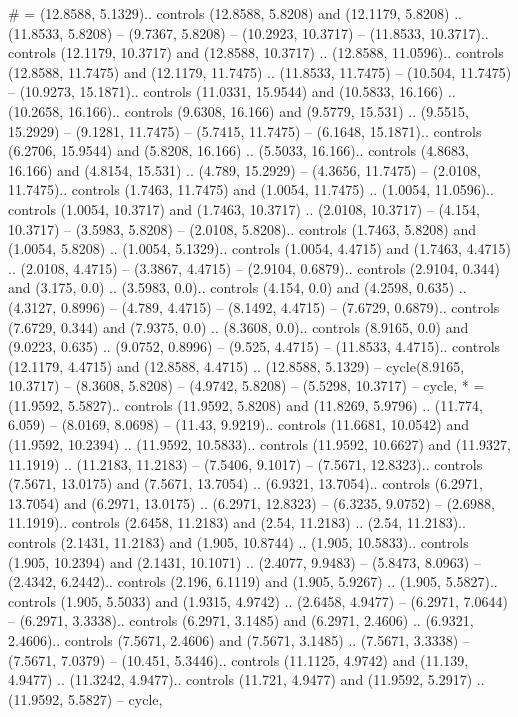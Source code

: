 {\#} = {(12.8588, 5.1329).. controls (12.8588, 5.8208) and (12.1179, 5.8208) .. (11.8533, 5.8208) -- (9.7367, 5.8208) -- (10.2923, 10.3717) -- (11.8533, 10.3717).. controls (12.1179, 10.3717) and (12.8588, 10.3717) .. (12.8588, 11.0596).. controls (12.8588, 11.7475) and (12.1179, 11.7475) .. (11.8533, 11.7475) -- (10.504, 11.7475) -- (10.9273, 15.1871).. controls (11.0331, 15.9544) and (10.5833, 16.166) .. (10.2658, 16.166).. controls (9.6308, 16.166) and (9.5779, 15.531) .. (9.5515, 15.2929) -- (9.1281, 11.7475) -- (5.7415, 11.7475) -- (6.1648, 15.1871).. controls (6.2706, 15.9544) and (5.8208, 16.166) .. (5.5033, 16.166).. controls (4.8683, 16.166) and (4.8154, 15.531) .. (4.789, 15.2929) -- (4.3656, 11.7475) -- (2.0108, 11.7475).. controls (1.7463, 11.7475) and (1.0054, 11.7475) .. (1.0054, 11.0596).. controls (1.0054, 10.3717) and (1.7463, 10.3717) .. (2.0108, 10.3717) -- (4.154, 10.3717) -- (3.5983, 5.8208) -- (2.0108, 5.8208).. controls (1.7463, 5.8208) and (1.0054, 5.8208) .. (1.0054, 5.1329).. controls (1.0054, 4.4715) and (1.7463, 4.4715) .. (2.0108, 4.4715) -- (3.3867, 4.4715) -- (2.9104, 0.6879).. controls (2.9104, 0.344) and (3.175, 0.0) .. (3.5983, 0.0).. controls (4.154, 0.0) and (4.2598, 0.635) .. (4.3127, 0.8996) -- (4.789, 4.4715) -- (8.1492, 4.4715) -- (7.6729, 0.6879).. controls (7.6729, 0.344) and (7.9375, 0.0) .. (8.3608, 0.0).. controls (8.9165, 0.0) and (9.0223, 0.635) .. (9.0752, 0.8996) -- (9.525, 4.4715) -- (11.8533, 4.4715).. controls (12.1179, 4.4715) and (12.8588, 4.4715) .. (12.8588, 5.1329) -- cycle(8.9165, 10.3717) -- (8.3608, 5.8208) -- (4.9742, 5.8208) -- (5.5298, 10.3717) -- cycle},
{*} = {(11.9592, 5.5827).. controls (11.9592, 5.8208) and (11.8269, 5.9796) .. (11.774, 6.059) -- (8.0169, 8.0698) -- (11.43, 9.9219).. controls (11.6681, 10.0542) and (11.9592, 10.2394) .. (11.9592, 10.5833).. controls (11.9592, 10.6627) and (11.9327, 11.1919) .. (11.2183, 11.2183) -- (7.5406, 9.1017) -- (7.5671, 12.8323).. controls (7.5671, 13.0175) and (7.5671, 13.7054) .. (6.9321, 13.7054).. controls (6.2971, 13.7054) and (6.2971, 13.0175) .. (6.2971, 12.8323) -- (6.3235, 9.0752) -- (2.6988, 11.1919).. controls (2.6458, 11.2183) and (2.54, 11.2183) .. (2.54, 11.2183).. controls (2.1431, 11.2183) and (1.905, 10.8744) .. (1.905, 10.5833).. controls (1.905, 10.2394) and (2.1431, 10.1071) .. (2.4077, 9.9483) -- (5.8473, 8.0963) -- (2.4342, 6.2442).. controls (2.196, 6.1119) and (1.905, 5.9267) .. (1.905, 5.5827).. controls (1.905, 5.5033) and (1.9315, 4.9742) .. (2.6458, 4.9477) -- (6.2971, 7.0644) -- (6.2971, 3.3338).. controls (6.2971, 3.1485) and (6.2971, 2.4606) .. (6.9321, 2.4606).. controls (7.5671, 2.4606) and (7.5671, 3.1485) .. (7.5671, 3.3338) -- (7.5671, 7.0379) -- (10.451, 5.3446).. controls (11.1125, 4.9742) and (11.139, 4.9477) .. (11.3242, 4.9477).. controls (11.721, 4.9477) and (11.9592, 5.2917) .. (11.9592, 5.5827) -- cycle},

